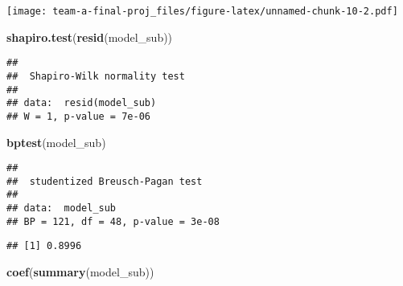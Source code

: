 \documentclass[]{article}
\newenvironment{Shaded}{\begin{snugshade}}{\end{snugshade}}
\newcommand{\KeywordTok}[1]{\textcolor[rgb]{0.13,0.29,0.53}{\textbf{#1}}}
\newcommand{\NormalTok}[1]{#1}
\newcommand{\OperatorTok}[1]{\textcolor[rgb]{0.81,0.36,0.00}{\textbf{#1}}}
\begin{document}
\texttt{[image: team-a-final-proj\_files/figure-latex/unnamed-chunk-10-2.pdf]}

\begin{Shaded}
\begin{Highlighting}[]
\KeywordTok{shapiro.test}\NormalTok{(}\KeywordTok{resid}\NormalTok{(model_sub))}
\end{Highlighting}
\end{Shaded}

\begin{verbatim}
## 
##  Shapiro-Wilk normality test
## 
## data:  resid(model_sub)
## W = 1, p-value = 7e-06
\end{verbatim}

\begin{Shaded}
\begin{Highlighting}[]
\KeywordTok{bptest}\NormalTok{(model_sub)}
\end{Highlighting}
\end{Shaded}

\begin{verbatim}
## 
##  studentized Breusch-Pagan test
## 
## data:  model_sub
## BP = 121, df = 48, p-value = 3e-08
\end{verbatim}

\begin{Shaded}
\end{Shaded}

\begin{verbatim}
## [1] 0.8996
\end{verbatim}

\begin{Shaded}
\begin{Highlighting}[]
\KeywordTok{coef}\NormalTok{(}\KeywordTok{summary}\NormalTok{(model_sub))}
\end{Highlighting}
\end{Shaded}
\end{document}
